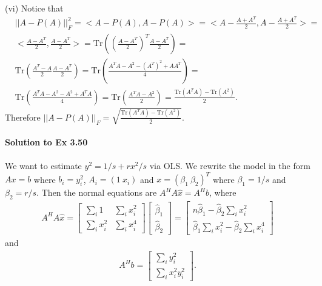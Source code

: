 \documentclass[letterpaper,12pt]{article}
\theoremstyle{definition}
\begin{document}
\begin{spacing}{1.3}{}
	(vi)
	Notice that
	\begin{align*}
	&||A - P(A)||_F^2 = <A - P(A), A - P(A)> =
	<A - \frac{A + A^T}{2}, A - \frac{A + A^T}{2}> =\\
	&<\frac{A - A^T}{2}, \frac{A - A^T}{2}> =
	\text{Tr}\left(\left(\frac{A - A^T}{2}\right)^T\frac{A - A^T}{2}\right)=\\
	&\text{Tr}\left(\frac{A^T - A}{2}\frac{A - A^T}{2}\right) =
	\text{Tr}\left(\frac{A^TA - A^2 - (A^T)^2 + AA^T}{4}\right) =\\
	&\text{Tr}\left(\frac{A^TA - A^2 - A^2 + A^TA}{4}\right) =
	\text{Tr}\left(\frac{A^TA - A^2}{2}\right) =
	\frac{\text{Tr}(A^TA) - \text{Tr}(A^2)}{2}.
	\end{align*}
	Therefore $||A - P(A)||_F = \sqrt{\frac{\text{Tr}(A^TA) - \text{Tr}(A^2)}{2}}$. \\\\
	
	\textbf{Solution to Ex 3.50} \\\\
	We want to estimate $y^2=1/s+rx^2/s$ via OLS.
	We rewrite the model in the form $Ax=b$ where
	$b_i=y_i^2$, $A_i=(1\ x_i)$ and $x=(\beta_1\ \beta_2)^T$ where $\beta_1=1/s$ and $\beta_2=r/s$.
	Then the normal equations are $A^HA\hat{x}=A^Hb$, where
	\begin{align*}
	A^HA\hat{x} =
	\begin{bmatrix}
	\sum_i 1 & \sum_ix_i^2\\
	\sum_ix_i^2& \sum_ix_i^4
	\end{bmatrix}
	\begin{bmatrix}
	\hat{\beta}_1\\ \hat{\beta}_2
	\end{bmatrix} =
	\begin{bmatrix}
	n\hat{\beta}_1 - \hat{\beta}_2\sum_i x_i^2\\
	\hat{\beta}_1\sum_ix_i^2 - \hat{\beta}_2\sum_ix_i^4
	\end{bmatrix}
	\end{align*}
	and
	\begin{align*}
	A^Hb=
	\begin{bmatrix}
	\sum_i y_i^2\\
	\sum_i x_i^2y_i^2
	\end{bmatrix}.
	\end{align*}
	
	

 \end{spacing}
\end{document}
